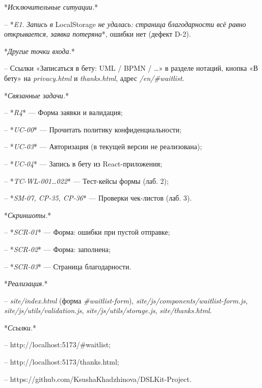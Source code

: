 \documentclass[a4paper,14pt]{extarticle}
\begin{document}
*\textit{Исключительные ситуации.}*


– *\textit{E1.}\textit{ Запись в }LocalStorage\textit{ не удалась: страница благодарности всё равно открывается, }\textit{заявка потеряна}*, ошибки нет (дефект D-2).



*\textit{Другие точки входа.}*


– Ссылки «Записаться в бету: UML / BPMN / …» в разделе нотаций, кнопка «В бету» на \textit{privacy.html} и \textit{thanks.html}, адрес \textit{/en/\#waitlist}.



*\textit{Связанные задачи.}*


– *\textit{R4}* — Форма заявки и валидация;

– *\textit{UC-00}* — Прочитать политику конфиденциальности;

– *\textit{UC-03}* — Авторизация (в текущей версии не реализована);

– *\textit{UC-04}* — Запись в бету из React-приложения;

– *\textit{TC-WL-001…022}* — Тест-кейсы формы (лаб. 2);

– *\textit{SM-07, CP-35, CP-36}* — Проверки чек-листов (лаб. 3).



*\textit{Скриншоты.}*


– *\textit{SCR-01}* — Форма: ошибки при пустой отправке;

– *\textit{SCR-02}* — Форма: заполнена;

– *\textit{SCR-03}* — Страница благодарности.



*\textit{Реализация.}*


– \textit{site/index.html} (форма \textit{\#waitlist-form}), \textit{site/js/components/waitlist-form.js}, \textit{site/js/utils/validation.js}, \textit{site/js/utils/storage.js}, \textit{site/thanks.html}.



*\textit{Ссылки.}*


– http://localhost:5173/\#waitlist;

– http://localhost:5173/thanks.html;

– https://github.com/KsushaKhadzhinova/DSLKit-Project.
\end{document}
